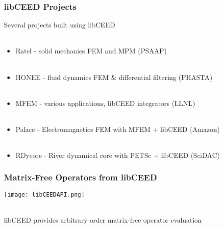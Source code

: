 \documentclass{beamer}
\begin{document}
\begin{frame}
\begin{center}
\frametitle{libCEED Projects}

Several projects built using libCEED\\

~\\

\begin{itemize}

\item Ratel - solid mechanics FEM and MPM (PSAAP)\\

~\\

\item HONEE - fluid dynamics FEM \& differential filtering (PHASTA)\\

~\\

\item MFEM - various applications, libCEED integrators (LLNL)\\

~\\

\item Palace - Electromagnetics FEM with MFEM + libCEED (Amazon)\\

~\\

\item RDycore - River dynamical core with PETSc + libCEED (SciDAC)\\

\end{itemize}

\end{center}
\end{frame}


\begin{frame}
\begin{center}
\frametitle{Matrix-Free Operators from libCEED}

\texttt{[image: libCEEDAPI.png]}

~\\

libCEED provides arbitrary order matrix-free operator evaluation\\

\end{center}
\end{frame}
\end{document}
